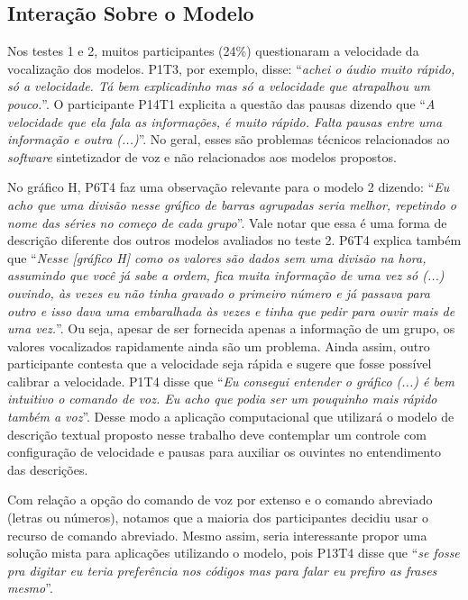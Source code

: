 \documentclass[
	12pt,				%
	openright,			%
	oneside,			%
	a4paper,			%
	english,			%
	brazil				%
	]{abntex2}
\begin{document}
\subsection{Interação Sobre o Modelo}

Nos testes 1 e 2, muitos participantes (24\%) questionaram a velocidade da vocalização dos modelos. P1T3, por exemplo, disse: ``\textit{achei o áudio muito rápido, só a velocidade. Tá bem explicadinho mas só a velocidade que atrapalhou um pouco.}''. O participante P14T1 explicita a questão das pausas dizendo que ``\textit{A velocidade que ela fala as informações, é muito rápido. Falta pausas entre uma informação e outra (...)}''. No geral, esses são problemas técnicos relacionados ao \textit{software} sintetizador de voz e não relacionados aos modelos propostos. 

No gráfico H, P6T4 faz uma observação relevante para o modelo 2 dizendo: ``\textit{Eu acho que uma divisão nesse gráfico de barras agrupadas seria melhor, repetindo o nome das séries no começo de cada grupo}''. Vale notar que essa é uma forma de descrição diferente dos outros modelos avaliados no teste 2. P6T4 explica também que ``\textit{Nesse [gráfico H] como os valores são dados sem uma divisão na hora, assumindo que você já sabe a ordem, fica muita informação de uma vez só (...) ouvindo, às vezes eu não tinha gravado o primeiro número e já passava para outro e isso dava uma embaralhada às vezes e tinha que pedir para ouvir mais de uma vez.}''. Ou seja, apesar de ser fornecida apenas a informação de um grupo, os valores vocalizados rapidamente ainda são um problema. Ainda assim, outro participante contesta que a velocidade seja rápida e sugere que fosse possível calibrar a velocidade. P1T4 disse que ``\textit{Eu consegui entender o gráfico (...) é bem intuitivo o comando de voz. Eu acho que podia ser um pouquinho mais rápido também a voz}''. Desse modo a aplicação computacional que utilizará o modelo de descrição textual proposto nesse trabalho deve contemplar um controle com configuração de velocidade e pausas para auxiliar os ouvintes no entendimento das descrições.

Com relação a opção do comando de voz por extenso e o comando abreviado (letras ou números), notamos que a maioria dos participantes decidiu usar o recurso de comando abreviado. Mesmo assim, seria interessante propor uma solução mista para aplicações utilizando o modelo, pois P13T4 disse que ``\textit{se fosse pra digitar eu teria preferência nos códigos mas para falar eu prefiro as frases mesmo}''.
\end{document}
